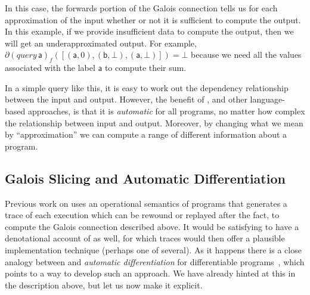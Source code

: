 \begin{example}
  In this case, the forwards portion of the Galois connection tells us for each approximation of the input whether or not it is sufficient to compute the output. In this example, if we provide insufficient data to compute the output, then we will get an underapproximated output. For example, $\partial (\mathit{query}\, \mathsf{a})_f([(\mathsf{a},0),(\mathsf{b},\bot),(\mathsf{a},\bot)]) = \bot$ because we need all the values associated with the label $\mathsf{a}$ to compute their sum.

  In a simple query like this, it is easy to work out the dependency relationship between the input and output. However, the benefit of \GPS, and other language-based approaches, is that it is {\em automatic} for all programs, no matter how complex the relationship between input and output. Moreover, by changing what we mean by ``approximation'' we can compute a range of different information about a program.
\end{example}

\subsection{Galois Slicing and Automatic Differentiation}

Previous work on \GPS uses an operational semantics of programs that generates a trace of each execution which can be rewound or replayed after the fact, to compute the Galois connection described above. It would be satisfying to have a denotational account of \GPS as well, for which traces would then offer a plausible implementation technique (perhaps one of several). As it happens there is a close analogy between \GPS and \emph{automatic differentiation} for differentiable programs~\cite{siskind08,elliott18}, which points to a way to develop such an approach. We have already hinted at this in the description above, but let us now make it explicit.

